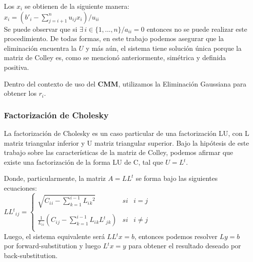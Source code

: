 Los $x{_i}$ se obtienen de la siguiente manera: \\

$x{_i} = (b'{_i} - \sum\limits_{j = i + 1}^n u_{ij}x_{i}) / u_{ii}$ \\

Se puede observar que si $\exists \, i \in \{1, ..., n\} / a_{ii} = 0$ entonces no se puede realizar este procedimiento. De todas formas, en este trabajo podemos asegurar que la eliminaci\'on encuentra la $U$ y m\'as a\'un, el sistema tiene soluci\'on \'unica porque la matriz de Colley es, como se mencion\'o anteriormente, sim\'etrica y definida positiva.

Dentro del contexto de uso del \textbf{CMM}, utilizamos la Eliminaci\'on Gaussiana para obtener los $r_i$.

\subsubsection{Factorizaci\'on de Cholesky} \label{intro_cholesky}

La factorizaci\'on de Cholesky es un caso particular de una factorizaci\'on LU, con L matriz triangular inferior y U matriz triangular superior. Bajo la hip\'otesis de este trabajo sobre las caracter\'isticas de la matriz de Colley, podemos afirmar que existe una factorizaci\'on de la forma LU de C, tal que $U = L{^t}$.

Donde, particularmente, la matriz $A = LL^{t}$ se forma bajo las siguientes ecuaciones: \\

$LL{^t}{_i}{_j} =
\left\{
	\begin{array}{lcc}
		\sqrt{C{_i}{_i} - \sum\limits_{k=1}^{i-1} L{_i}{_k}^2} & si & i = j \\
		\\ \frac{1}{L{_i}{_i}}(C{_i}{_j} - \sum\limits_{k=1}^{i-1} L{_i}{_k}L{^t}{_j}{_k}) & si & i \neq j \\
	\end{array}
\right.$ \\

Luego, el sistema equivalente ser\'a $LL{^t}x = b$, entonces podemos resolver $Ly = b$ por forward-substitution y luego $L{^t}x = y$ para obtener el resultado deseado por back-substitution.
